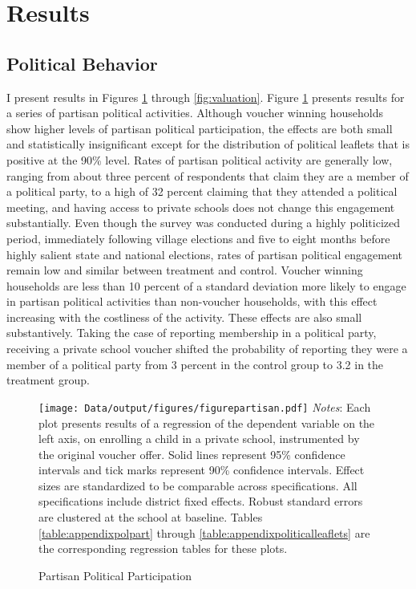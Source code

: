 \documentclass[hidelinks, 12pt, titlepage]{article}
\begin{document}
\section*{Results\label{section:results}}

	\subsection*{Political Behavior}

		I present results in Figures \ref{fig:partisan} through \ref{fig:valuation}.  Figure \ref{fig:partisan} presents results for a series of partisan political activities.  Although voucher winning households show higher levels of partisan political participation, the effects are both small and statistically insignificant except for the distribution of political leaflets that is positive at the 90\% level.  Rates of partisan political activity are generally low, ranging from about three percent of respondents that claim they are a member of a political party, to a high of 32 percent claiming that they attended a political meeting, and having access to private schools does not change this engagement substantially.  Even though the survey was conducted during a highly politicized period, immediately following village elections and five to eight months before highly salient state and national elections, rates of partisan political engagement remain low and similar between treatment and control.  Voucher winning households are less than 10 percent of a standard deviation more likely to engage in partisan political activities than non-voucher households, with this effect increasing with the costliness of the activity.  These effects are also small substantively.  Taking the case of reporting membership in a political party, receiving a private school voucher shifted the probability of reporting they were a member of a political party from 3 percent in the control group to 3.2 in the treatment group.

		\begin{figure}[htbp]
			\caption{Partisan Political Participation\label{fig:partisan}}
			\centering
			\begin{minipage}{5.5in}
				\texttt{[image: Data/output/figures/figurepartisan.pdf]}
				\footnotesize
				\emph{Notes}: Each plot presents results of a regression of the dependent variable on the left axis, on enrolling a child in a private school, instrumented by the original voucher offer.  Solid lines represent 95\% confidence intervals and tick marks represent 90\% confidence intervals.  Effect sizes are standardized to be comparable across specifications.  All specifications include district fixed effects.  Robust standard errors are clustered at the school at baseline. Tables \ref{table:appendixpolpart} through \ref{table:appendixpoliticalleaflets} are the corresponding regression tables for these plots.
			\end{minipage}
		\end{figure}
\end{document}
